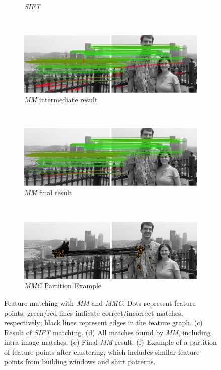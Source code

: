 \documentclass[conference]{IEEEtran}
\begin{document}
\begin{figure}
\begin{subfigure}[t]{\columnwidth}
			\caption{\emph{SIFT}}
			\label{fig:unique}
		\end{subfigure}%
		\\ %
		\begin{subfigure}[t]{\columnwidth}
			\centering
			\includegraphics[width=0.85\columnwidth]{images/mirror_match_with_pruned}
			\caption{\emph{MM} intermediate result}
			\label{fig:within}
		\end{subfigure}%
		\\ %
		\begin{subfigure}[t]{\columnwidth}
			\centering
			\includegraphics[width=0.85\columnwidth]{images/mirror_match}
			\caption{\emph{MM} final result}
			\label{fig:without}
		\end{subfigure}%
		\\ %
		\begin{subfigure}[t]{\columnwidth}
			\centering
			\includegraphics[width=0.85\columnwidth]{images/MMC_partition}
			\caption{\emph{MMC} Partition Example}
			\label{fig:pitts_partition}
		\end{subfigure}%
	\caption{Feature matching with \emph{MM} and \emph{MMC}. Dots represent feature points; green/red lines indicate correct/incorrect matches, respectively; black lines represent edges in the feature graph.  
	(c) Result of \emph{SIFT} matching. 
  (d) All matches found by \emph{MM}, including intra-image matches. 
	(e) Final \emph{MM} result. 
	(f) Example of a partition of feature points after clustering, which 
includes similar feature points from building windows and shirt patterns.}%
	\label{fig:comparemirror}%
\end{figure}%
\end{document}
